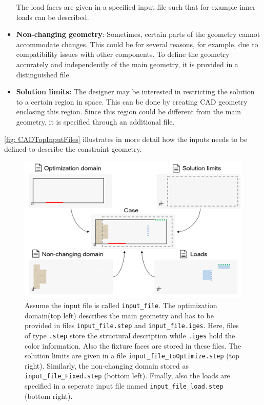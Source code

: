 \begin{itemize}
The load faces are given in a specified input file such that for example inner loads can be described.

	\item \textbf{Non-changing geometry}: Sometimes, certain parts of the geometry cannot accommodate changes. This could be for several reasons, for example, due to compatibility issues with other components. To define the geometry accurately and independently of the main geometry, it is provided in a distinguished file.%
	\item \textbf{Solution limits:} The designer may be interested in restricting the solution to a certain region in space. This can be done by creating CAD geometry enclosing this region. Since this region could be different from the main geometry, it is specified through an additional file.
\end{itemize}

\autoref{fig: CADTopInputFiles} illustrates in more detail how the inputs needs to be defined to describe the constraint geometry. 

\begin{figure}
\includegraphics[width=\textwidth]{Pictures/four_files.png}
\caption{Assume the input file is called \texttt{input{\_}file}. The optimization domain(top left) describes the main geometry and has to be provided in files \texttt{input{\_}file.step} and \texttt{input{\_}file.iges}. Here, files of type \texttt{.step} store the structural description while \texttt{.iges} hold the color information. Also the fixture faces are stored in these files. The solution limits are given in a file \texttt{input{\_}file{\_}toOptimize.step} (top right). Similarly, the non-changing domain stored as \texttt{input{\_}file{\_}Fixed.step} (bottom left). Finally, also the loads are specified in a seperate input file named \texttt{input{\_}file{\_}load.step} (bottom right).}
\label{fig: CADTopInputFiles}
\end{figure}
